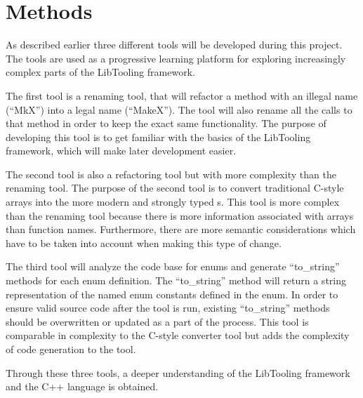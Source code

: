 \chapter{Methods}

As described earlier three different tools will be developed during this project. The tools are used as a progressive learning platform for exploring increasingly complex parts of the LibTooling framework. 

The first tool is a renaming tool, that will refactor a method with an illegal name (``MkX'') into a legal name (``MakeX''). The tool will also rename all the calls to that method in order to keep the exact same functionality. The purpose of developing this tool is to get familiar with the basics of the LibTooling framework, which will make later development easier. 

The second tool is also a refactoring tool but with more complexity than the renaming tool. The purpose of the second tool is to convert traditional C-style arrays into the more modern and strongly typed s. This tool is more complex than the renaming tool because there is more information associated with arrays than function names. Furthermore, there are more semantic considerations which have to be taken into account when making this type of change. 

The third tool will analyze the code base for enums and generate ``to\_string'' methods for each enum definition. The ``to\_string'' method will return a string representation of the named enum constants defined in the enum. In order to ensure valid source code after the tool is run, existing ``to\_string'' methods should be overwritten or updated as a part of the process. 
This tool is comparable in complexity to the C-style converter tool but adds the complexity of code generation to the tool. 

Through these three tools, a deeper understanding of the LibTooling framework and the C++ language is obtained.